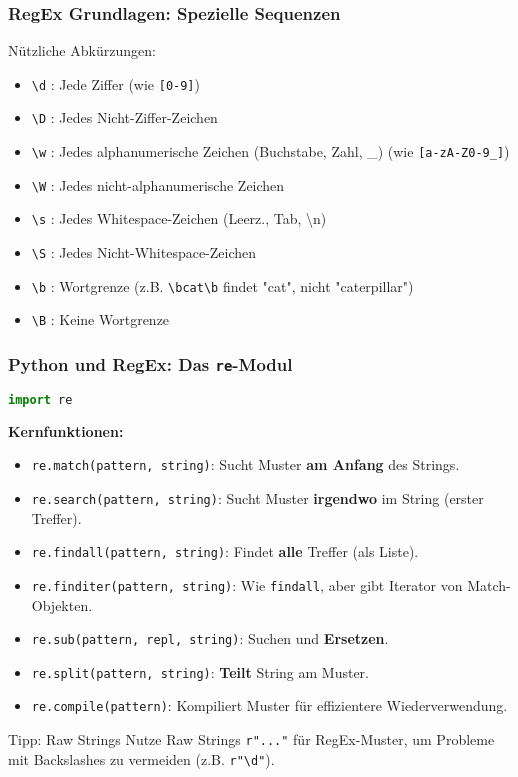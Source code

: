 \documentclass[aspectratio=169]{beamer} %
\begin{document}
\begin{frame}[fragile]
\frametitle{RegEx Grundlagen: Spezielle Sequenzen}
Nützliche Abkürzungen:
\begin{itemize}
    \item \texttt{\textbackslash{}d} : Jede Ziffer (wie \texttt{[0-9]})
    \item \texttt{\textbackslash{}D} : Jedes Nicht-Ziffer-Zeichen
    \item \texttt{\textbackslash{}w} : Jedes alphanumerische Zeichen (Buchstabe, Zahl, \_) (wie \texttt{[a-zA-Z0-9\_]})
    \item \texttt{\textbackslash{}W} : Jedes nicht-alphanumerische Zeichen
    \item \texttt{\textbackslash{}s} : Jedes Whitespace-Zeichen (Leerz., Tab, \textbackslash{}n)
    \item \texttt{\textbackslash{}S} : Jedes Nicht-Whitespace-Zeichen
    \item \texttt{\textbackslash{}b} : Wortgrenze (z.B. \texttt{\textbackslash{}bcat\textbackslash{}b} findet "cat", nicht "caterpillar")
    \item \texttt{\textbackslash{}B} : Keine Wortgrenze
\end{itemize}
\end{frame}

\begin{frame}[fragile]
\frametitle{Python und RegEx: Das \texttt{re}-Modul}
\begin{lstlisting}[language=Python]
import re
\end{lstlisting}
\textbf{Kernfunktionen:}
\begin{itemize}
    \item \texttt{re.match(pattern, string)}: Sucht Muster \textbf{am Anfang} des Strings.
    \item \texttt{re.search(pattern, string)}: Sucht Muster \textbf{irgendwo} im String (erster Treffer).
    \item \texttt{re.findall(pattern, string)}: Findet \textbf{alle} Treffer (als Liste).
    \item \texttt{re.finditer(pattern, string)}: Wie \texttt{findall}, aber gibt Iterator von Match-Objekten.
    \item \texttt{re.sub(pattern, repl, string)}: Suchen und \textbf{Ersetzen}.
    \item \texttt{re.split(pattern, string)}: \textbf{Teilt} String am Muster.
    \item \texttt{re.compile(pattern)}: Kompiliert Muster für effizientere Wiederverwendung.
\end{itemize}
\begin{alertblock}{Tipp: Raw Strings}
Nutze Raw Strings \texttt{r"..."} für RegEx-Muster, um Probleme mit Backslashes zu vermeiden (z.B. \texttt{r"\textbackslash{}d"}).
\end{alertblock}
\end{frame}
\end{document}
